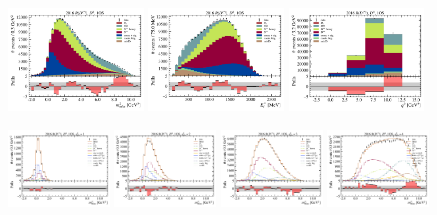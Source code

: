 \begin{figure}[htb]
    \centering
    \includegraphics[width=0.32\textwidth]{./figs-supplemental-plots/pre-ctrl-fit/stacked/fit_result-stacked-D0-1os-mmiss2.pdf}
    \includegraphics[width=0.32\textwidth]{./figs-supplemental-plots/pre-ctrl-fit/stacked/fit_result-stacked-D0-1os-el.pdf}
    \includegraphics[width=0.32\textwidth]{./figs-supplemental-plots/pre-ctrl-fit/stacked/fit_result-stacked-D0-1os-q2.pdf}

    \includegraphics[width=0.24\textwidth]{./figs-supplemental-plots/pre-ctrl-fit/lines_q2_slices/fit_result-lines_q2_idx1-D0-1os-mmiss2.pdf}
    \includegraphics[width=0.24\textwidth]{./figs-supplemental-plots/pre-ctrl-fit/lines_q2_slices/fit_result-lines_q2_idx2-D0-1os-mmiss2.pdf}
    \includegraphics[width=0.24\textwidth]{./figs-supplemental-plots/pre-ctrl-fit/lines_q2_slices/fit_result-lines_q2_idx3-D0-1os-mmiss2.pdf}
    \includegraphics[width=0.24\textwidth]{./figs-supplemental-plots/pre-ctrl-fit/lines_q2_slices/fit_result-lines_q2_idx4-D0-1os-mmiss2.pdf}


\end{figure}
